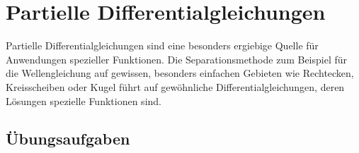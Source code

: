 %
%
%
\chapter{Partielle Differentialgleichungen
\label{buch:chapter:pde}}
\rhead{}
Partielle Differentialgleichungen sind eine besonders ergiebige
Quelle für Anwendungen spezieller Funktionen.
Die Separationsmethode zum Beispiel für die Wellengleichung
auf gewissen, besonders einfachen Gebieten wie Rechtecken,
Kreisscheiben oder Kugel führt auf gewöhnliche Differentialgleichungen,
deren Lösungen spezielle Funktionen sind.







\section*{Übungsaufgaben}
\begin{uebungsaufgaben}
\end{uebungsaufgaben}

